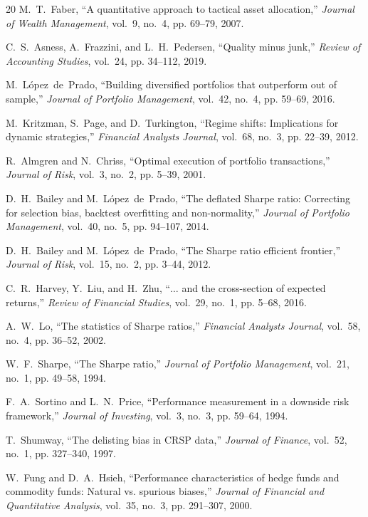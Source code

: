 \documentclass[conference]{IEEEtran}
\begin{document}
\begin{thebibliography}{20}
M.~T.~Faber, ``A quantitative approach to tactical asset allocation,''
\emph{Journal of Wealth Management}, vol.~9, no.~4, pp. 69--79, 2007.

C.~S.~Asness, A.~Frazzini, and L.~H.~Pedersen, ``Quality minus junk,''
\emph{Review of Accounting Studies}, vol.~24, pp. 34--112, 2019.

M.~L\'opez~de~Prado, ``Building diversified portfolios that outperform
out of sample,'' \emph{Journal of Portfolio Management}, vol.~42, no.~4,
pp. 59--69, 2016.

M.~Kritzman, S.~Page, and D.~Turkington, ``Regime shifts: Implications for
dynamic strategies,'' \emph{Financial Analysts Journal}, vol.~68, no.~3,
pp. 22--39, 2012.

R.~Almgren and N.~Chriss, ``Optimal execution of portfolio transactions,''
\emph{Journal of Risk}, vol.~3, no.~2, pp. 5--39, 2001.

D.~H.~Bailey and M.~L\'opez~de~Prado, ``The deflated Sharpe ratio:
Correcting for selection bias, backtest overfitting and non-normality,''
\emph{Journal of Portfolio Management}, vol.~40, no.~5, pp. 94--107, 2014.

D.~H.~Bailey and M.~L\'opez~de~Prado, ``The Sharpe ratio efficient frontier,''
\emph{Journal of Risk}, vol.~15, no.~2, pp. 3--44, 2012.

C.~R.~Harvey, Y.~Liu, and H.~Zhu, ``$\ldots$ and the cross-section of expected
returns,'' \emph{Review of Financial Studies}, vol.~29, no.~1, pp. 5--68,
2016.

A.~W.~Lo, ``The statistics of Sharpe ratios,'' \emph{Financial Analysts
Journal}, vol.~58, no.~4, pp. 36--52, 2002.

W.~F.~Sharpe, ``The Sharpe ratio,'' \emph{Journal of Portfolio Management},
vol.~21, no.~1, pp. 49--58, 1994.

F.~A.~Sortino and L.~N.~Price, ``Performance measurement in a downside risk
framework,'' \emph{Journal of Investing}, vol.~3, no.~3, pp. 59--64, 1994.

T.~Shumway, ``The delisting bias in CRSP data,'' \emph{Journal of Finance},
vol.~52, no.~1, pp. 327--340, 1997.

W.~Fung and D.~A.~Hsieh, ``Performance characteristics of hedge funds and
commodity funds: Natural vs. spurious biases,'' \emph{Journal of Financial and
Quantitative Analysis}, vol.~35, no.~3, pp. 291--307, 2000.

\end{thebibliography}
\end{document}
